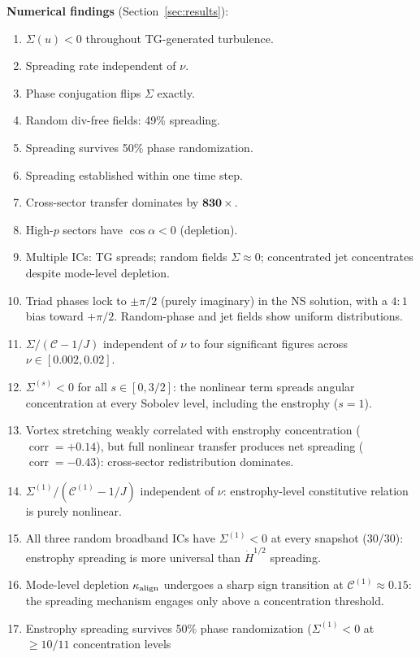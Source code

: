 \documentclass[11pt]{article}
\theoremstyle{definition}
\newcommand{\Hdot}[1]{\dot{H}^{#1}}
\newcommand{\cC}{\mathcal{C}}
\DeclareMathOperator{\corr}{corr}
\begin{document}
\noindent\textbf{Numerical findings}
(Section~\ref{sec:results}):
\begin{enumerate}[leftmargin=2em,label=(N\arabic*)]
\item $\Sigma(u) < 0$ throughout TG-generated turbulence.
\item Spreading rate independent of $\nu$.
\item Phase conjugation flips $\Sigma$ exactly.
\item Random div-free fields: 49\% spreading.
\item Spreading survives 50\% phase randomization.
\item Spreading established within one time step.
\item Cross-sector transfer dominates by $\mathbf{830\times}$.
\item High-$p$ sectors have $\cos\alpha < 0$ (depletion).
\item Multiple ICs: TG spreads; random fields $\Sigma\approx 0$;
  concentrated jet concentrates despite mode-level depletion.
\item Triad phases lock to $\pm\pi/2$ (purely imaginary)
  in the NS solution, with a $4\!:\!1$ bias toward $+\pi/2$.
  Random-phase and jet fields show uniform distributions.
\item $\Sigma/(\cC-1/J)$ independent of $\nu$ to four
  significant figures across $\nu\in[0.002,0.02]$.
\item $\Sigma^{(s)}<0$ for all $s\in[0,3/2]$: the nonlinear
  term spreads angular concentration at every Sobolev level,
  including the enstrophy ($s=1$).
\item Vortex stretching weakly correlated with enstrophy
  concentration ($\corr=+0.14$), but full nonlinear transfer
  produces net spreading ($\corr=-0.43$): cross-sector
  redistribution dominates.
\item $\Sigma^{(1)}/(\cC^{(1)}-1/J)$ independent of $\nu$:
  enstrophy-level constitutive relation is purely nonlinear.
\item All three random broadband ICs have $\Sigma^{(1)}<0$ at
  every snapshot (30/30): enstrophy spreading is more universal
  than $\Hdot{1/2}$ spreading.
\item Mode-level depletion $\kappa_{\rm align}$ undergoes a
  sharp sign transition at $\cC^{(1)}\approx 0.15$: the
  spreading mechanism engages only above a concentration
  threshold.
\item Enstrophy spreading survives 50\% phase randomization
  ($\Sigma^{(1)}<0$ at $\geq 10/11$ concentration levels

\end{enumerate}
\end{document}
